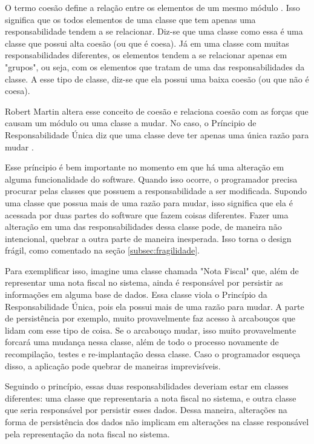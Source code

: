 O termo coesão define a relação entre os elementos de um mesmo módulo \cite{demarco} \cite{pagejones}. Isso significa que
os todos elementos de uma classe que tem apenas uma responsabilidade tendem a se relacionar. Diz-se que uma classe
como essa é uma classe que possui alta coesão (ou que é coesa). Já em uma classe
com muitas responsabilidades diferentes, os elementos tendem a se relacionar apenas em "grupos", ou seja, com os elementos
que tratam de uma das responsabilidades da classe. A esse tipo de classe, diz-se que ela possui uma baixa coesão (ou que não é
coesa).

Robert Martin altera esse conceito de coesão e relaciona coesão com as forças que causam um módulo ou uma classe a mudar. No caso,
o Príncipio de Responsabilidade Única diz que uma classe deve ter apenas uma única razão para mudar \cite{bob-martin}.

Esse príncipio é bem importante no momento em que há uma alteração em alguma funcionalidade do software. Quando isso ocorre,
o programador precisa procurar pelas classes que possuem a responsabilidade a ser modificada. Supondo uma classe que 
possua mais de uma razão para mudar, isso significa que ela é acessada por duas partes do software que fazem coisas diferentes.
Fazer uma alteração em uma das responsabilidades dessa classe pode, de maneira não intencional, quebrar a outra parte
de maneira inesperada. Isso torna o design frágil, como comentado na seção \ref{subsec:fragilidade}.

Para exemplificar isso, imagine uma classe chamada "Nota Fiscal" que, além de representar uma nota fiscal no sistema, ainda
é responsável por persistir as informações em alguma base de dados. Essa classe viola o Princípio da Responsabilidade Única,
pois ela possui mais de uma razão para mudar. A parte de persistência por exemplo, muito provavelmente faz acesso à arcabouços
que lidam com esse tipo de coisa. Se o arcabouço mudar, isso muito provavelmente forcará uma mudança nessa classe, além de 
todo o processo novamente de recompilação, testes e re-implantação dessa classe. Caso o programador esqueça disso, a aplicação
pode quebrar de maneiras imprevisíveis.

Seguindo o princípio, essas duas responsabilidades deveriam estar em classes diferentes: uma classe que representaria a nota
fiscal no sistema, e outra classe que seria responsável por persistir esses dados. Dessa maneira, alterações na forma de
persistência dos dados não implicam em alterações na classe responsável pela representação da nota fiscal no sistema.

